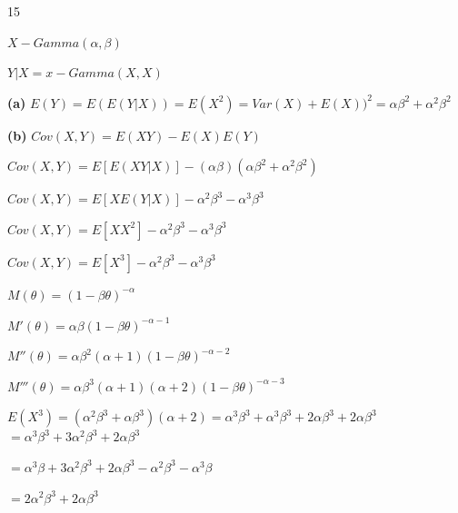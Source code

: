 \documentclass[12 pt]{article}
\begin{document}
    \begin{exercise}{15}
    \hfill

    $X - Gamma(\alpha, \beta)$

    $Y|X= x - Gamma(X,X)$

    \hfill

    \textbf{(a)}
    $E(Y) = E(E(Y|X)) = E(X^2) = Var(X) + E(X))^2 = \alpha \beta^2 + \alpha^2 \beta^2$

    \hfill

    \textbf{(b)}
    $Cov(X,Y) = E(XY) - E(X)E(Y)$

    $Cov(X,Y) = E[E(XY|X)] - (\alpha \beta)(\alpha \beta^2 + \alpha^2 \beta^2)$

    $Cov(X,Y) = E[X E(Y|X)] - \alpha^2 \beta^3 - \alpha^3 \beta^3$

    $Cov(X,Y) = E[X X^2] - \alpha^2 \beta^3 - \alpha^3 \beta^3$

    $Cov(X,Y) = E[X^3] - \alpha^2 \beta^3 - \alpha^3 \beta^3$

    \hfill

    $M(\theta) = (1 - \beta \theta)^{-\alpha}$

    $M'(\theta) = \alpha \beta (1 - \beta \theta)^{-\alpha - 1}$

    $M''(\theta) = \alpha \beta^2 (\alpha + 1)(1 - \beta \theta)^{-\alpha - 2}$

    $M'''(\theta) = \alpha \beta^3 (\alpha + 1)(\alpha + 2)(1 - \beta \theta)^{-\alpha - 3}$

    $E(X^3) = (\alpha^2 \beta^3 + \alpha \beta^3)(\alpha + 2) = \alpha^3 \beta^3 + \alpha^3 \beta^3 + 2 \alpha \beta^3 + 2 \alpha \beta^3$
    $= \alpha^3 \beta^3 + 3 \alpha^2 \beta^3 + 2 \alpha \beta^3$

    \hfill

    $= \alpha^3 \beta + 3 \alpha^2 \beta^3 + 2\alpha \beta^3 - \alpha^2 \beta^3 - \alpha^3 \beta$

    $= 2 \alpha^2 \beta^3 + 2 \alpha \beta^3$
    
    \hfill    
    \end{exercise}
\end{document}
